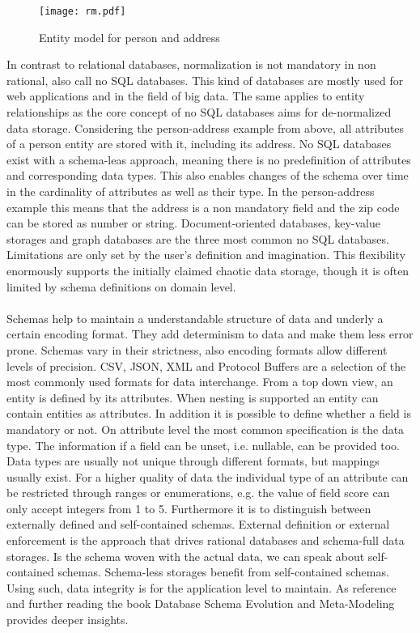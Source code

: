 \begin{figure}[htb]
  \centering
  \texttt{[image: rm.pdf]}\\
  \caption{Entity model for person and address}\label{fig:rm}
\end{figure}

In contrast to relational databases, normalization is not mandatory in non rational, also call no SQL databases. This kind of databases are mostly used for web applications and in the field of big data. The same applies to entity relationships as the core concept of no SQL databases aims for de-normalized data storage. Considering the person-address example from above, all attributes of a person entity are stored with it, including its address. No SQL databases exist with a schema-leas approach, meaning there is no predefinition of attributes and corresponding data types. This also enables changes of the schema over time in the cardinality of attributes as well as their type. In the person-address example this means that the address is a non mandatory field and the zip code can be stored as number or string. Document-oriented databases, key-value storages and graph databases are the three most common no SQL databases.  Limitations are only set by the user's definition and imagination. This flexibility enormously supports the initially claimed chaotic data storage, though it is often limited by schema definitions on domain level. 
\\\\
Schemas help to maintain a understandable structure of data and underly a certain encoding format. They add determinism to data and make them less error prone. Schemas vary in their strictness, also encoding formats allow different levels of precision. CSV, JSON, XML and Protocol Buffers are a selection of the most commonly used formats for data interchange. From a top down view, an entity is defined by its attributes. When nesting is supported an entity can contain entities as attributes. In addition it is possible to define whether a field is mandatory or not. On attribute level the most common specification is the data type. The information if a field can be unset, i.e. nullable, can be provided too. Data types are usually not unique through different formats, but mappings usually exist. For a higher quality of data the individual type of an attribute can be restricted through ranges or enumerations, e.g. the value of field score can only accept integers from 1 to 5. Furthermore it is to distinguish between externally defined and self-contained schemas. External definition or external enforcement is the approach that drives rational databases and schema-full data storages. Is the schema woven with the actual data, we can speak about self-contained schemas. Schema-less storages benefit from self-contained schemas. Using such, data integrity is for the application level to maintain. As reference and further reading the book Database Schema Evolution and Meta-Modeling\cite{balsters_brock_conrad_2006} provides deeper insights.

